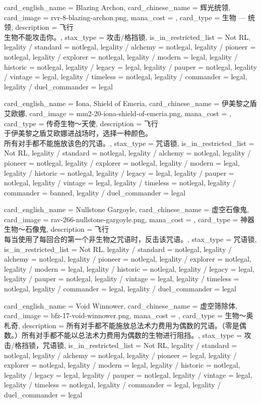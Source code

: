 \documentclass[lang = cn, color = black, 10pt]{AllThatStax}
\begin{document}
\card
{
	card_english_name = {Blazing Archon},
	card_chinese_name = {辉光统领},
	card_image = rvr-8-blazing-archon.png,
	mana_cost = ,
	card_type = 生物 — 统领,
	description = {飞行\\
		生物不能攻击你。},
	stax_type = 攻击/格挡锁,
	is_in_restricted_list = Not RL,
	legality / standard = notlegal,
	legality / alchemy = notlegal,
	legality / pioneer = notlegal,
	legality / explorer = notlegal,
	legality / modern = legal,
	legality / historic = notlegal,
	legality / legacy = legal,
	legality / pauper = notlegal,
	legality / vintage = legal,
	legality / timeless = notlegal,
	legality / commander = legal,
	legality / duel_commander = legal
}

\card
{
	card_english_name = {Iona, Shield of Emeria},
	card_chinese_name = {伊美黎之盾艾欧娜},
	card_image = mm2-20-iona-shield-of-emeria.png,
	mana_cost = ,
	card_type = 传奇生物～天使,
	description = {飞行\\
		于伊美黎之盾艾欧娜进战场时，选择一种颜色。\\
		所有对手都不能施放该色的咒语。},
	stax_type = 咒语锁,
	is_in_restricted_list = Not RL,
	legality / standard = notlegal,
	legality / alchemy = notlegal,
	legality / pioneer = notlegal,
	legality / explorer = notlegal,
	legality / modern = legal,
	legality / historic = notlegal,
	legality / legacy = legal,
	legality / pauper = notlegal,
	legality / vintage = legal,
	legality / timeless = notlegal,
	legality / commander = banned,
	legality / duel_commander = legal
}

\card
{
	card_english_name = {Nullstone Gargoyle},
	card_chinese_name = {虚空石像鬼},
	card_image = rav-266-nullstone-gargoyle.png,
	mana_cost = ,
	card_type = 神器生物～石像鬼,
	description = {飞行\\
		每当使用了每回合的第一个非生物之咒语时，反击该咒语。},
	stax_type = 咒语锁,
	is_in_restricted_list = Not RL,
	legality / standard = notlegal,
	legality / alchemy = notlegal,
	legality / pioneer = notlegal,
	legality / explorer = notlegal,
	legality / modern = legal,
	legality / historic = notlegal,
	legality / legacy = legal,
	legality / pauper = notlegal,
	legality / vintage = legal,
	legality / timeless = notlegal,
	legality / commander = legal,
	legality / duel_commander = legal
}

\card
{
	card_english_name = {Void Winnower},
	card_chinese_name = {虚空筛除体},
	card_image = bfz-17-void-winnower.png,
	mana_cost = ,
	card_type = 生物～奥札奇,
	description = {所有对手都不能施放总法术力费用为偶数的咒语。（零是偶数。）所有对手都不能以总法术力费用为偶数的生物进行阻挡。},
	stax_type = 攻击/格挡锁，咒语锁,
	is_in_restricted_list = Not RL,
	legality / standard = notlegal,
	legality / alchemy = notlegal,
	legality / pioneer = legal,
	legality / explorer = notlegal,
	legality / modern = legal,
	legality / historic = notlegal,
	legality / legacy = legal,
	legality / pauper = notlegal,
	legality / vintage = legal,
	legality / timeless = notlegal,
	legality / commander = legal,
	legality / duel_commander = legal
}
\end{document}
